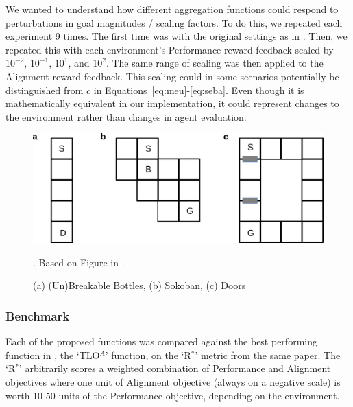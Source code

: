 We wanted to understand how different aggregation functions could respond to perturbations in goal magnitudes / scaling factors. To do this, we repeated each experiment 9 times. The first time was with the original settings as in \cite{vamplew_potential-based_2021}. Then, we repeated this with each environment's Performance reward feedback scaled by $10^{-2}$, $10^{-1}$, $10^1$, and $10^2$. The same range of scaling was then applied to the Alignment reward feedback. This scaling could in some scenarios potentially be distinguished from $c$ in Equations~\ref{eq:meu}-\ref{eq:seba}. Even though it is mathematically equivalent in our implementation, it could represent changes to the environment rather than changes in agent evaluation.


\begin{figure}
    \centering
    \includegraphics[width=1\columnwidth]{output/env_figure.pdf}
    \caption{(a) (Un)Breakable Bottles, (b) Sokoban, (c) Doors}. Based on Figure in \cite{vamplew_potential-based_2021}.
    \label{fig:envs}
\end{figure}

\subsubsection{Benchmark}

Each of the proposed functions was compared against the best performing function in \cite{vamplew_potential-based_2021}, the `TLO$^A$' function, on the `R$^*$' metric from the same paper. The `R$^*$' arbitrarily scores a weighted combination of Performance and Alignment objectives where one unit of Alignment objective (always on a negative scale) is worth 10-50 units of the Performance objective, depending on the environment.%


